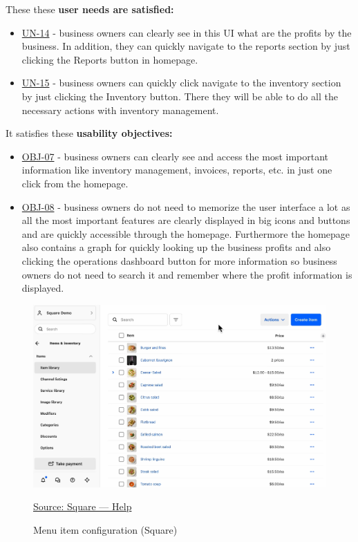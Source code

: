 \documentclass[]{VUMIFTemplateClass}
\begin{document}
These these \textbf{user needs are satisfied:}
\begin{itemize}
    \item \hyperref[UN-14]{UN-14} - business owners can clearly see in this UI what are the profits by the business. In addition, they can quickly navigate to the reports section by just clicking the Reports button in homepage.
    \item \hyperref[UN-15]{UN-15} - business owners can quickly click navigate to the inventory section by just clicking the Inventory button. There they will be able to do all the necessary actions with inventory management.
\end{itemize}

It satisfies these \textbf{usability objectives:}

\begin{itemize}
    \item \hyperref[OBJ-07]{OBJ-07} - business owners can clearly see and access the most important information like inventory management, invoices, reports, etc. in just one click from the homepage.
    \item \hyperref[OBJ-08]{OBJ-08} - business owners do not need to memorize the user interface a lot as all the most important features are clearly displayed in big icons and buttons and are quickly accessible through the homepage. Furthermore the homepage also contains a graph for quickly looking up the business profits and also clicking the operations dashboard button for more information so business owners do not need to search it and remember where the profit information is displayed.
\end{itemize}






\begin{figure}[H]
    \centering
    \includegraphics[width=\textwidth]{images/examples/item_menu_square.png}
    \caption{Menu item configuration (Square)}
    \href{https://squareup.com/help/us/en}{Source: Square — Help}
    \label{fig:menu-item}
\end{figure}
\end{document}
